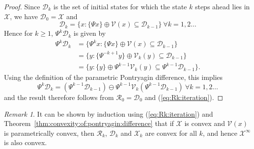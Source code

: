 \documentclass[journal]{IEEEtran}
\newcounter{thmcount}
\theoremstyle{remark}
\newtheorem{rem}[thmcount]{Remark}
\theoremstyle{definition}
\begin{document}
\begin{proof}
Since $\mathcal{D}_k$ is the set of initial states for which the state $k$ steps ahead lies in $\mathcal{X}$, we have $\mathcal{D}_0 = \mathcal{X}$ and
\[
\mathcal{D}_k = \bigl\{ x : \{\Psi x\} \oplus \mathcal{V}(x) \subseteq \mathcal{D}_{k-1}\bigr\}  
\ \forall k = 1,2\ldots 
\]
Hence for $k\geq 1$, $\Psi^k \mathcal{D}_k$ is given by
\begin{align*}
\Psi^k\mathcal{D}_k &= \bigl\{ \Psi^k x : \{\Psi x\} \oplus \mathcal{V}(x) \subseteq \mathcal{D}_{k-1}\bigr\} \\
& = \bigl\{ y : \{\Psi^{-k+1} y\} \oplus \mathcal{V}_k(y) \subseteq \mathcal{D}_{k-1}\bigr\} \\
& = \bigl\{ y : \{ y\} \oplus \Psi^{k-1}\mathcal{V}_k(y) \subseteq \Psi^{k-1}\mathcal{D}_{k-1}\bigr\} .
\end{align*}
Using the definition of the parametric Pontryagin difference, this implies
\[
\Psi^{k}\mathcal{D}_k = (\Psi^{k-1}\mathcal{D}_{k-1}) \ominus \Psi^{k-1}\mathcal{V}_k(\Psi^{k-1}\mathcal{D}_{k-1}) \ \forall k=1,2\ldots 
\]
and the result therefore follows from  $\mathcal{R}_0=\mathcal{D}_0$ and (\ref{eq:Rk:iteration}).
%
\end{proof}%

\begin{rem}
It can be shown by induction using (\ref{eq:Rk:iteration}) and Theorem~\ref{thm:convexity:of:pontryagin:difference} that if $\mathcal{X}$ is convex and $\mathcal{V}(x)$ is parametrically convex, then $\mathcal{R}_k$, $\mathcal{D}_k$ and $\mathcal{X}_k$ are convex for all $k$, and hence $\mathcal{X}^\infty$ is also convex.
\end{rem}%
\end{document}
